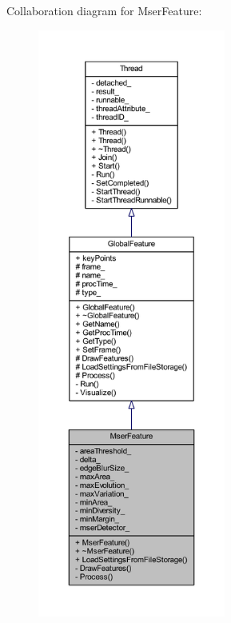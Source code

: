 Collaboration diagram for Mser\-Feature\-:
\nopagebreak
\begin{figure}[H]
\begin{center}
\leavevmode
\includegraphics[height=550pt]{class_mser_feature__coll__graph}
\end{center}
\end{figure}
